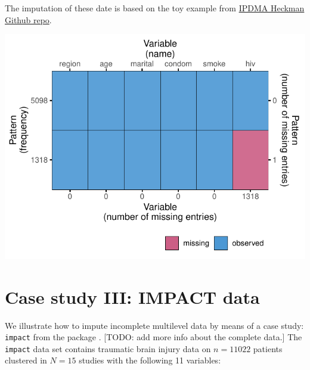 \documentclass[
]{jss}
\begin{document}
The imputation of these date is based on the toy example from
\href{https://github.com/johamunoz/Heckman-IPDMA/blob/main/Toy_example.R}{IPDMA
Heckman Github repo}.

\begin{CodeChunk}


\begin{center}\includegraphics{Imputation_of_Incomplete_Multilevel_Data_files/figure-latex/hiv-1} \end{center}

\end{CodeChunk}

\hypertarget{case-study-iii-impact-data}{%
\section{Case study III: IMPACT data}\label{case-study-iii-impact-data}}

We illustrate how to impute incomplete multilevel data by means of a
case study: \texttt{impact} from the  package
\citep[empirical data on traumatic brain injuries, \(n = 11,022\) units
across \(N = 15\) clusters,][]{metamisc}. {[}TODO: add more info about
the complete data.{]} The \texttt{impact} data set contains traumatic
brain injury data on \(n = 11022\) patients clustered in \(N = 15\)
studies with the following 11 variables:
\end{document}
